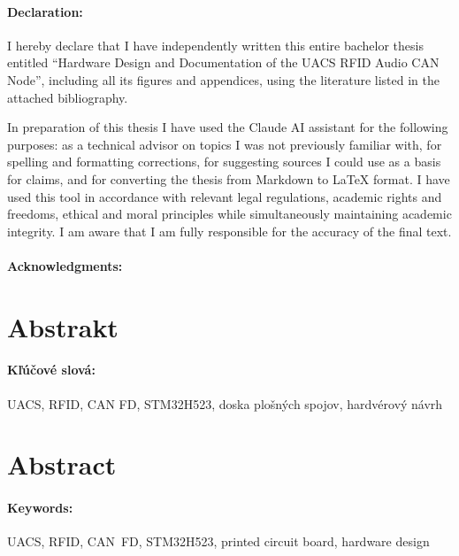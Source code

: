 \documentclass[12pt, oneside]{book}  %
\def\mfnazov{Hardware Design and Documentation of the UACS RFID Audio CAN Node}
\begin{document}
\paragraph{Declaration:}
I hereby declare that I have independently written this entire
bachelor thesis entitled ``\mfnazov'', including all its
figures and appendices, using the literature listed in the attached
bibliography.

In preparation of this thesis I have used the Claude AI assistant for the
following purposes: as a technical advisor on topics I was not previously
familiar with, for spelling and formatting corrections, for suggesting
sources I could use as a basis for claims, and for converting the thesis
from Markdown to \LaTeX{} format. I have used this tool in accordance with
relevant legal regulations, academic rights and freedoms, ethical and moral
principles while simultaneously maintaining academic integrity. I am aware
that I am fully responsible for the accuracy of the final text.

\paragraph{Acknowledgments:}


\newpage
\section*{Abstrakt}


\paragraph*{Kľúčové slová:} UACS, RFID, CAN FD, STM32H523, doska plošných spojov, hardvérový návrh


\newpage
\section*{Abstract}


\paragraph*{Keywords:} UACS, RFID, CAN~FD, STM32H523, printed circuit board, hardware design
\end{document}
